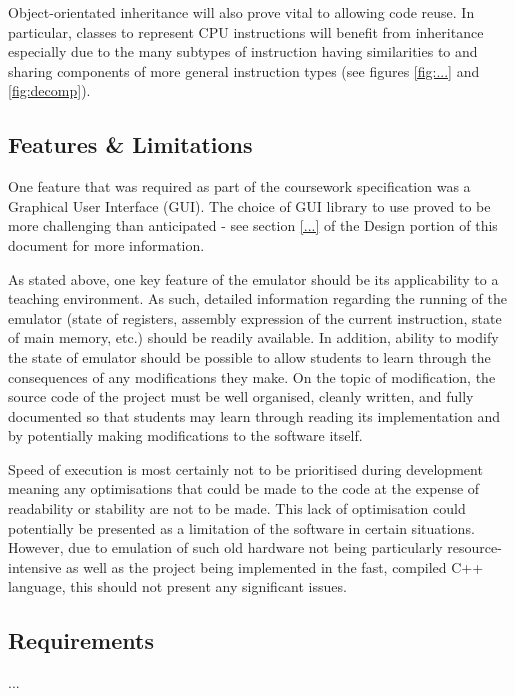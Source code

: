         Object-orientated inheritance will also prove vital to allowing code reuse. In particular, classes to represent CPU instructions will benefit from inheritance especially due to the many subtypes of instruction having similarities to and sharing components of more general instruction types (see figures \ref{fig:...} and \ref{fig:decomp}).


\subsection{Features \& Limitations}
    One feature that was required as part of the coursework specification was a Graphical User Interface (GUI). The choice of GUI library to use proved to be more challenging than anticipated - see section \ref{...} of the Design portion of this document for more information.

    As stated above, one key feature of the emulator should be its applicability to a teaching environment. As such, detailed information regarding the running of the emulator (state of registers, assembly expression of the current instruction, state of main memory, etc.) should be readily available. In addition, ability to modify the state of emulator should be possible to allow students to learn through the consequences of any modifications they make. On the topic of modification, the source code of the project must be well organised, cleanly written, and fully documented so that students may learn through reading its implementation and by potentially making modifications to the software itself.

    Speed of execution is most certainly not to be prioritised during development meaning any optimisations that could be made to the code at the expense of readability or stability are not to be made. This lack of optimisation could potentially be presented as a limitation of the software in certain situations. However, due to emulation of such old hardware not being particularly resource-intensive as well as the project being implemented in the fast, compiled C++ language, this should not present any significant issues.

\subsection{Requirements} %
    ...

